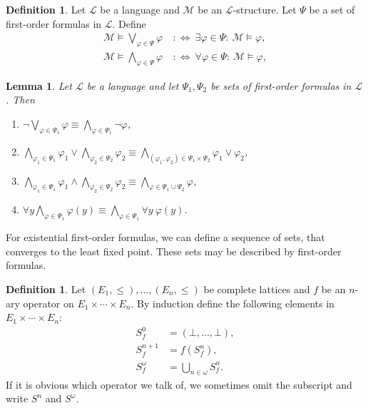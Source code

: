 \documentclass[acmsmall]{acmart}
\theoremstyle{plain}
\newtheorem{lemma}[theorem]{Lemma}
\theoremstyle{definition}
\newtheorem{definition}[theorem]{Definition}
\newcommand{\calL}{\mathcal{L}}
\newcommand{\calM}{\mathcal{M}}
\begin{document}
\begin{definition}\label{def.infiniteFormulas}
	Let $\calL$ be a language and $\calM$ be an $\calL$-structure. Let $\Psi$ be a set of first-order formulas in $\calL$. Define
	\begin{align*}
		\calM \models \bigvee_{\varphi \in \Psi} \varphi ~&:\Leftrightarrow~ \exists \varphi \in \Psi :~ \calM \models \varphi, \\
		\calM \models \bigwedge_{\varphi \in \Psi} \varphi ~&:\Leftrightarrow~ \forall \varphi \in \Psi :~ \calM \models \varphi,
	\end{align*}
\end{definition}

\begin{lemma}\label{lem.infiniteFormulas}
	Let $\calL$ be a language and let $\Psi_1,\Psi_2$ be sets of first-order formulas in $\calL$. Then
	\begin{enumerate}
		\item $ \neg \bigvee_{\varphi \in \Psi_1} \varphi \equiv \bigwedge_{\varphi \in \Psi_1} \neg \varphi$,
		\item  $\bigwedge_{\varphi_1 \in \Psi_1} \varphi_1 \vee \bigwedge_{\varphi_2 \in \Psi_2} \varphi_2 \equiv \bigwedge_{(\varphi_1,\varphi_2) \in \Psi_1\times\Psi_2} \varphi_1 \vee \varphi_2$,
		\item  $\bigwedge_{\varphi_1 \in \Psi_1} \varphi_1 \wedge \bigwedge_{\varphi_2 \in \Psi_2} \varphi_2 \equiv \bigwedge_{\varphi \in \Psi_1\cup\Psi_2} \varphi$,
		\item $\forall y \bigwedge_{\varphi \in \Psi_1} \varphi(y) \equiv \bigwedge_{\varphi \in \Psi_1} \forall y ~\varphi(y)$.
	\end{enumerate}
\end{lemma}

For existential first-order formulas, we can define a sequence of sets, that converges to the least fixed point. These sets may be described by first-order formulas.

\begin{definition}
		Let $(E_1,\leq),...,(E_n,\leq)$ be complete lattices and $f$ be an $n$-ary operator on $E_1 \times \cdots \times E_n$.  By induction define the following elements in $E_1\times\cdots\times E_n $:
	\begin{align}\label{ifpSequenceDefinition}
		S_f^0 &= (\bot,...,\bot),\nonumber\\
		S_f^{n+1} &= f(S_f^{n}),\\
		S_f^{\omega} &= \bigcup_{n \in \omega} S_f^{n}.\nonumber
	\end{align}
If it is obvious which operator we talk of, we sometimes omit the subscript and write $S^{n}$ and $S^\omega$.
\end{definition}
\end{document}
